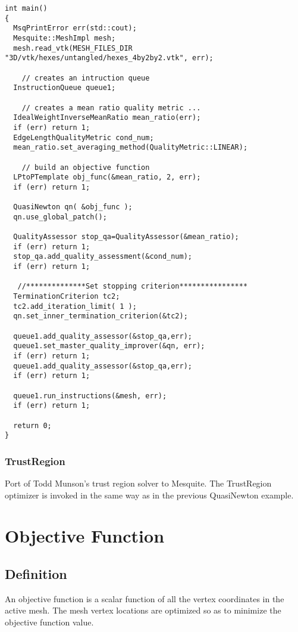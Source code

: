 \begin{lstlisting}[frame=single]
int main()
{
  MsqPrintError err(std::cout);
  Mesquite::MeshImpl mesh;
  mesh.read_vtk(MESH_FILES_DIR "3D/vtk/hexes/untangled/hexes_4by2by2.vtk", err);
  
    // creates an intruction queue
  InstructionQueue queue1;
  
    // creates a mean ratio quality metric ...
  IdealWeightInverseMeanRatio mean_ratio(err);
  if (err) return 1;
  EdgeLengthQualityMetric cond_num;
  mean_ratio.set_averaging_method(QualityMetric::LINEAR);
  
    // build an objective function
  LPtoPTemplate obj_func(&mean_ratio, 2, err);
  if (err) return 1;

  QuasiNewton qn( &obj_func );
  qn.use_global_patch();
  
  QualityAssessor stop_qa=QualityAssessor(&mean_ratio);
  if (err) return 1;
  stop_qa.add_quality_assessment(&cond_num);
  if (err) return 1;
    
   //**************Set stopping criterion****************
  TerminationCriterion tc2;
  tc2.add_iteration_limit( 1 );
  qn.set_inner_termination_criterion(&tc2);

  queue1.add_quality_assessor(&stop_qa,err);
  queue1.set_master_quality_improver(&qn, err); 
  if (err) return 1;
  queue1.add_quality_assessor(&stop_qa,err);
  if (err) return 1;

  queue1.run_instructions(&mesh, err);
  if (err) return 1;
  
  return 0;
}
\end{lstlisting}


\subsubsection{TrustRegion}
Port of Todd Munson's trust region solver to Mesquite.  The TrustRegion optimizer is invoked in the same way as in the previous QuasiNewton example.


\section{Objective Function}
\label{sec:ObjectiveFunction}

\subsection{Definition}

An objective function is a scalar function of all the vertex coordinates in the active mesh.  The mesh vertex locations are optimized so as to minimize the objective function value.  

